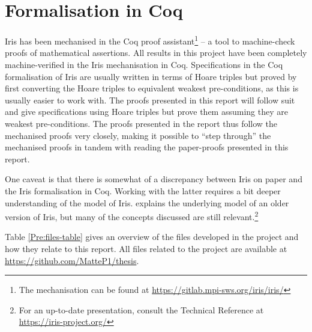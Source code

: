 \documentclass[a4paper, 10pt]{report}
\theoremstyle{definition}
\begin{document}
\section{Formalisation in Coq}
\label{Pre:section:coq}

Iris has been mechanised in the Coq proof assistant\footnote{The mechanisation can be found at \url{https://gitlab.mpi-sws.org/iris/iris/}} -- a tool to machine-check proofs of mathematical assertions. All results in this project have been completely machine-verified in the Iris mechanisation in Coq. Specifications in the Coq formalisation of Iris are usually written in terms of Hoare triples but proved by first converting the Hoare triples to equivalent weakest pre-conditions, as this is usually easier to work with. The proofs presented in this report will follow suit and give specifications using Hoare triples but prove them assuming they are weakest pre-conditions. The proofs presented in the report thus follow the mechanised proofs very closely, making it possible to ``step through'' the mechanised proofs in tandem with reading the paper-proofs presented in this report.

One caveat is that there is somewhat of a discrepancy between Iris on paper and the Iris formalisation in Coq. Working with the latter requires a bit deeper understanding of the model of Iris. \citet{DBLP:journals/jfp/JungKJBBD18} explains the underlying model of an older version of Iris, but many of the concepts discussed are still relevant.\footnote{For an up-to-date presentation, consult the Technical Reference at \url{https://iris-project.org/}}

Table \ref{Pre:files-table} gives an overview of the files developed in the project and how they relate to this report. All files related to the project are available at \url{https://github.com/MatteP1/thesis}.
\end{document}

